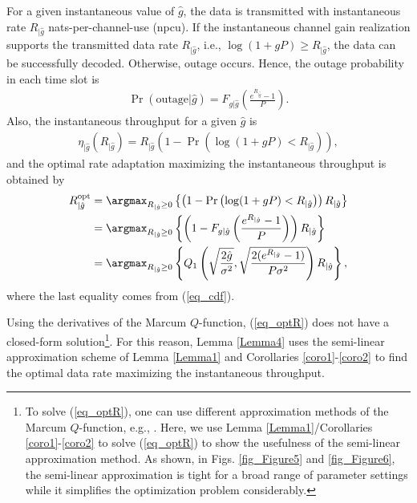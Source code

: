 For a given instantaneous value of $\hat g$, the data is transmitted with instantaneous rate $R_{|\hat{g}}$ nats-per-channel-use (npcu). If the instantaneous channel gain realization supports the transmitted data rate $R_{|\hat{g}}$, i.e., $\log(1+gP)\ge R_{|\hat{g}}$, the data can be successfully decoded. Otherwise,  outage occurs. Hence, the outage probability in each time slot is
\begin{align}
    \Pr(\text{outage}|\hat{g}) = F_{g|\hat{g}}\left(\frac{e^{R_{|\hat{g}}}-1}{P}\right).
\end{align}
Also, the instantaneous throughput for a given $\hat{g}$ is
\begin{align}\label{eq_opteta}
\eta_{|\hat {g}}\left(R_{|\hat{g}}\right)=R_{|\hat{g}}\left(1-\Pr\left(\log(1+gP)<R_{|\hat{g}}\right)\right),
\end{align}
and the optimal rate adaptation maximizing the  instantaneous throughput is obtained by
\begin{align}\label{eq_optR}
    R_{|\hat{g}}^{\text{opt}}&=\argmax_{R_{|\hat{g}}\geq 0} \left\{ \left(1-\Pr\left(\log(1+gP)<R_{|\hat{g}}\right)\right)R_{|\hat{g}} \right\}\nonumber\\
    &=\argmax_{R_{|\hat{g}}\geq 0} \left\{ \left(1-F_{g|\hat{g}}\left(\frac{e^{R_{|\hat{g}}}-1}{P}\right)\right) R_{|\hat{g}}\right\}\nonumber\\
    &=\argmax_{R_{|\hat{g}}\geq 0} \left\{ Q_1\left(  \sqrt{\frac{2\hat{g}}{\sigma^2}}, \sqrt{\frac{2(e^{R_{|\hat{g}}}-1)}{P\sigma^2}} \right)R_{|\hat{g}} \right\},
\end{align}
where the last equality comes from (\ref{eq_cdf}). 

Using the derivatives of the Marcum $Q$-function, (\ref{eq_optR}) does not have a closed-form solution\footnote{To solve (\ref{eq_optR}), one can use different approximation methods of the Marcum $Q$-function, e.g., \cite{Guo2019WCLrate}. Here, we use Lemma \ref{Lemma1}/Corollaries \ref{coro1}-\ref{coro2} to solve (\ref{eq_optR}) to show the usefulness of the semi-linear approximation method. As shown, in Figs. \ref{fig_Figure5} and \ref{fig_Figure6}, the semi-linear approximation is tight for a broad range of parameter settings while it simplifies the optimization problem considerably. }. For this reason,  Lemma \ref{Lemma4}  uses the semi-linear approximation scheme of Lemma \ref{Lemma1} and Corollaries \ref{coro1}-\ref{coro2} to find the optimal data rate maximizing the instantaneous throughput.

